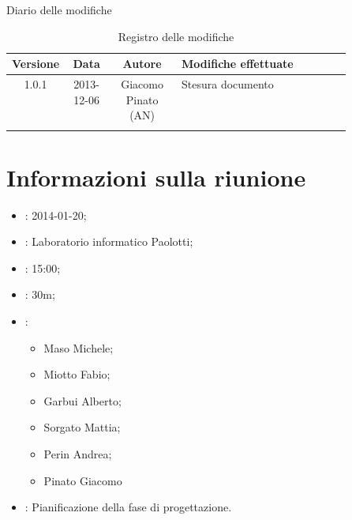 
\newpage
Diario delle modifiche
\begin{center}
\begin{longtable}{|c|c|c|p{0.5\linewidth}|}
\toprule
\textbf{Versione} & \textbf{Data} & \textbf{Autore} & \textbf{Modifiche effettuate}\\


\midrule
1.0.1 & 2013-12-06 & Giacomo Pinato (AN) & Stesura documento\\

\bottomrule
\caption{Registro delle modifiche}
\label{tab:changelog}
\end{longtable}
\end{center}

\newpage
\tableofcontents


\newpage
\section{Informazioni sulla riunione}%
\label{1.0}
\begin{itemize}
\item {}: 2014-01-20;
\item {}: Laboratorio informatico Paolotti;
\item {}: 15:00;
\item {}: 30m;
\item {}: \NomeGruppo{}
\begin{itemize}
\item Maso Michele;
\item Miotto Fabio;
\item Garbui Alberto;
\item Sorgato Mattia;
\item Perin Andrea;
\item Pinato Giacomo
\end{itemize}
\item {}: Pianificazione della fase di progettazione.
\end{itemize}

